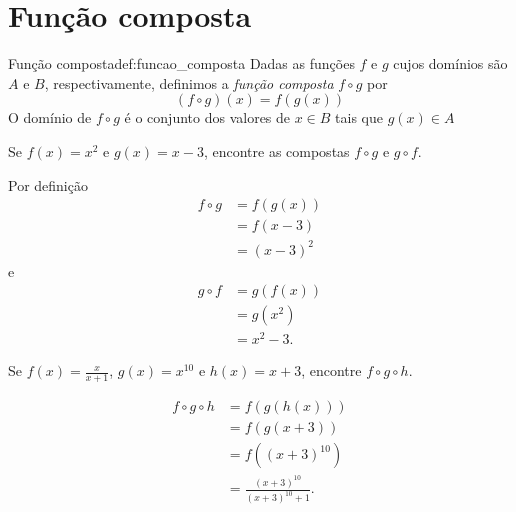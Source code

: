 \section{Função composta}

\begin{definicao}{Função composta}{def:funcao_composta}
  Dadas as funções $f$ e $ g$ cujos domínios são $A$ e $B$, respectivamente,
  definimos a \emph{função composta} $f \circ g$ por
  \[
    (f \circ g)(x)= f(g(x))
  \]
  O domínio de $f \circ g$ é o conjunto dos valores de $x \in B$
  tais que $g(x) \in A$
\end{definicao}

\begin{example}
  Se $f(x)= x^2$ e $g(x)=x-3$, encontre as compostas
  $f \circ g$ e $g \circ f$.

  \solution
  Por definição
  \begin{align*}
    f \circ g
    & = f(g(x)) \\
    & = f(x-3)  \\
    & = (x-3)^2
  \end{align*}
  e
  \begin{align*}
    g \circ f
    & = g(f(x)) \\
    & = g(x^2)  \\
    & = x^2-3.
  \end{align*}
\end{example}

\begin{example}
  Se
  \(f(x) = \frac{x}{x+1}\),
  \(g(x) = x^{10}\) e
  \(h(x) = x+3\),
  encontre  $f \circ g \circ h$.

  \solution
  \begin{align*}
    f \circ g \circ h
    & = f(g(h(x)))                   \\
    & = f(g(x+3))                    \\
    & = f((x+3)^{10})                \\
    & = \frac{(x+3)^{10}}{(x+3)^{10}+1}.
  \end{align*}
\end{example}


